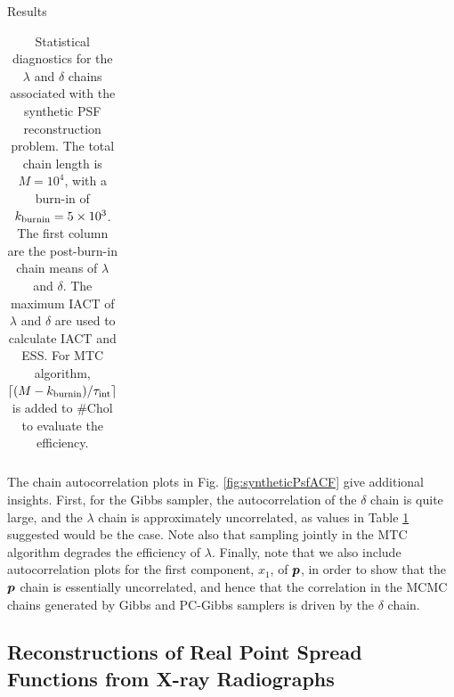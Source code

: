 \begin{chapter}{Results}
\begin{table}[h]
\begin{center}
\begin{tabular}{l|ccccccc}
    \hline
  \end{tabular}
  \caption{ Statistical diagnostics for the $\lambda$ and $\delta$ chains associated with the synthetic PSF reconstruction problem. The total chain length is $M=10^4$, with a burn-in of $k_{\rm burnin} = 5\times10^3$. The first column are the post-burn-in chain means of $\lambda$ and $\delta$. The maximum IACT of $\lambda$ and $\delta$ are used to calculate IACT and ESS. For MTC algorithm, $\lceil(M-k_{\rm burnin})/\tau_{\rm int}\rceil$ is added to \#Chol to evaluate the efficiency.} \label{tab:PSFDeltaChain}
\end{center}
\end{table}

The chain autocorrelation plots in Fig. \ref{fig:syntheticPsfACF} give additional insights. First, for the Gibbs sampler, the autocorrelation of the $\delta$ chain is quite large, and the $\lambda$ chain is approximately uncorrelated, as values in Table \ref{tab:PSFDeltaChain} suggested would be the case. Note also that sampling jointly in the MTC algorithm degrades the efficiency of $\lambda$. Finally, note that we also include autocorrelation plots for the first component, $x_1$, of $\mbox{\boldmath$p$}$, in order to show that the $\mbox{\boldmath$p$}$ chain is essentially uncorrelated, and hence that the correlation in the MCMC chains generated by Gibbs and PC-Gibbs samplers is driven by the $\delta$ chain. 

\subsection{Reconstructions of Real Point Spread Functions from X-ray Radiographs}\label{subsec:real data}



\end{chapter}
